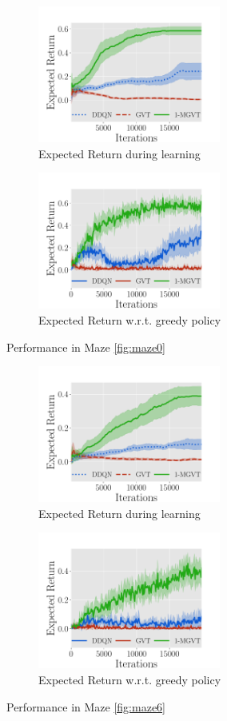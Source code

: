 \documentclass{article}
\begin{document}
\begin{figure}[h]
	\begin{subfigure}[b]{0.45\textwidth}
    \includegraphics[trim=0.0cm 0cm 1.8cm 1.3cm,clip=true,height=4.5cm]{images/maze/lrev_maze0.pdf}
    \caption{Expected Return during learning}
  \end{subfigure}
  \begin{subfigure}[b]{0.45\textwidth}
    \includegraphics[trim=0.0cm 0cm 1.8cm 1.3cm,clip=true,height=4.5cm]{images/maze/erew_maze0.pdf}
    \caption{Expected Return w.r.t. greedy policy}
  \end{subfigure}
  \caption{Performance in Maze \ref{fig:maze0}}
  \label{fig:rew-maze0}
  
  \begin{subfigure}[b]{0.45\textwidth}
    \includegraphics[trim=0.0cm 0cm 1.8cm 1.3cm,clip=true,height=4.5cm]{images/maze/lrev_maze6.pdf}
    \caption{Expected Return during learning}
  \end{subfigure}
  \begin{subfigure}[b]{0.45\textwidth}
    \includegraphics[trim=0.0cm 0cm 1.8cm 1.3cm,clip=true,height=4.5cm]{images/maze/erew_maze6.pdf}
    \caption{Expected Return w.r.t. greedy policy}
  \end{subfigure}
  \caption{Performance in Maze \ref{fig:maze6}}
  \label{fig:rew-maze6}
  

\end{figure}
\end{document}
